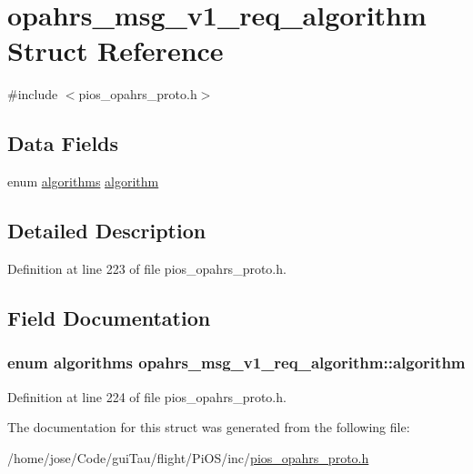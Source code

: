 \hypertarget{structopahrs__msg__v1__req__algorithm}{\section{opahrs\-\_\-msg\-\_\-v1\-\_\-req\-\_\-algorithm Struct Reference}
\label{structopahrs__msg__v1__req__algorithm}
}


{\ttfamily \#include $<$pios\-\_\-opahrs\-\_\-proto.\-h$>$}

\subsection*{Data Fields}
\begin{DoxyCompactItemize}
\item 
enum \hyperlink{group___p_i_o_s___o_p_a_h_r_s_gad28a1b6c64625a10e04b25f75d2e7b51}{algorithms} \hyperlink{structopahrs__msg__v1__req__algorithm_a124184c52f7f85c043e9400af7ea02d6}{algorithm}
\end{DoxyCompactItemize}


\subsection{Detailed Description}


Definition at line 223 of file pios\-\_\-opahrs\-\_\-proto.\-h.



\subsection{Field Documentation}
\hypertarget{structopahrs__msg__v1__req__algorithm_a124184c52f7f85c043e9400af7ea02d6}{
\subsubsection[{algorithm}]{\setlength{\rightskip}{0pt plus 5cm}enum {\bf algorithms} opahrs\-\_\-msg\-\_\-v1\-\_\-req\-\_\-algorithm\-::algorithm}}\label{structopahrs__msg__v1__req__algorithm_a124184c52f7f85c043e9400af7ea02d6}


Definition at line 224 of file pios\-\_\-opahrs\-\_\-proto.\-h.



The documentation for this struct was generated from the following file\-:\begin{DoxyCompactItemize}
\item 
/home/jose/\-Code/gui\-Tau/flight/\-Pi\-O\-S/inc/\hyperlink{pios__opahrs__proto_8h}{pios\-\_\-opahrs\-\_\-proto.\-h}\end{DoxyCompactItemize}
